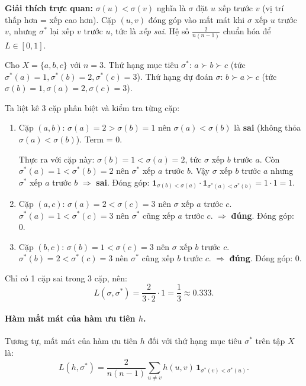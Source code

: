 \textbf{Giải thích trực quan:} $\sigma(u) < \sigma(v)$ nghĩa là $\sigma$ đặt $u$ xếp trước $v$ (vị trí thấp hơn = xếp cao hơn). Cặp $(u,v)$ đóng góp vào mất mát khi $\sigma$ xếp $u$ trước $v$, nhưng $\sigma^*$ lại xếp $v$ trước $u$, tức là \emph{xếp sai}. Hệ số $\frac{2}{n(n-1)}$ chuẩn hóa để $L \in [0,1]$.

\begin{example}
Cho $X = \{a, b, c\}$ với $n=3$. Thứ hạng mục tiêu $\sigma^*$: $a \succ b \succ c$ (tức $\sigma^*(a)=1, \sigma^*(b)=2, \sigma^*(c)=3$). Thứ hạng dự đoán $\sigma$: $b \succ a \succ c$ (tức $\sigma(b)=1, \sigma(a)=2, \sigma(c)=3$).

Ta liệt kê 3 cặp phân biệt và kiểm tra từng cặp:
\begin{enumerate}
    \item Cặp $(a,b)$: $\sigma(a)=2 > \sigma(b)=1$ nên $\sigma(a) < \sigma(b)$ là \textbf{sai} (không thỏa $\sigma(a)<\sigma(b)$). Term = 0.

    Thực ra với cặp này: $\sigma(b)=1 < \sigma(a)=2$, tức $\sigma$ xếp $b$ trước $a$. Còn $\sigma^*(a)=1 < \sigma^*(b)=2$ nên $\sigma^*$ xếp $a$ trước $b$. Vậy $\sigma$ xếp $b$ trước $a$ nhưng $\sigma^*$ xếp $a$ trước $b$ $\Rightarrow$ \textbf{sai}. Đóng góp: $\mathbf{1}_{\sigma(b)<\sigma(a)} \cdot \mathbf{1}_{\sigma^*(a)<\sigma^*(b)} = 1 \cdot 1 = 1$.

    \item Cặp $(a,c)$: $\sigma(a)=2 < \sigma(c)=3$ nên $\sigma$ xếp $a$ trước $c$. $\sigma^*(a)=1 < \sigma^*(c)=3$ nên $\sigma^*$ cũng xếp $a$ trước $c$. $\Rightarrow$ \textbf{đúng}. Đóng góp: 0.

    \item Cặp $(b,c)$: $\sigma(b)=1 < \sigma(c)=3$ nên $\sigma$ xếp $b$ trước $c$. $\sigma^*(b)=2 < \sigma^*(c)=3$ nên $\sigma^*$ cũng xếp $b$ trước $c$. $\Rightarrow$ \textbf{đúng}. Đóng góp: 0.
\end{enumerate}

Chỉ có 1 cặp sai trong 3 cặp, nên:
\[
    L(\sigma, \sigma^*) = \frac{2}{3 \cdot 2} \cdot 1 = \frac{1}{3} \approx 0.333.
\]
\end{example}

\paragraph{Hàm mất mát của hàm ưu tiên $h$.} Tương tự, mất mát của hàm ưu tiên $h$ đối với thứ hạng mục tiêu $\sigma^*$ trên tập $X$ là:
\begin{equation}
    L(h, \sigma^*) = \frac{2}{n(n-1)} \sum_{u \neq v} h(u, v)\, \mathbf{1}_{\sigma^*(v) < \sigma^*(u)}.
    \label{eq:loss_pref_h}
\end{equation}

